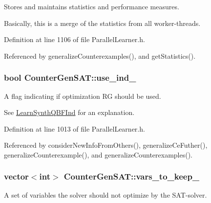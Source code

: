 Stores and maintains statistics and performance measures. 

Basically, this is a merge of the statistics from all worker-\/threads. 

Definition at line 1106 of file Parallel\-Learner.\-h.



Referenced by generalize\-Counterexamples(), and get\-Statistics().

\hypertarget{classCounterGenSAT_a4f76493e0c49329ae7f628af99a450f4}{
\subsubsection[{use\-\_\-ind\-\_\-}]{\setlength{\rightskip}{0pt plus 5cm}bool Counter\-Gen\-S\-A\-T\-::use\-\_\-ind\-\_\-\hspace{0.3cm}{\ttfamily [protected]}}}\label{classCounterGenSAT_a4f76493e0c49329ae7f628af99a450f4}


A flag indicating if optimization R\-G should be used. 

See \hyperlink{classLearnSynthQBFInd}{Learn\-Synth\-Q\-B\-F\-Ind} for an explanation. 

Definition at line 1013 of file Parallel\-Learner.\-h.



Referenced by consider\-New\-Info\-From\-Others(), generalize\-Ce\-Futher(), generalize\-Counterexample(), and generalize\-Counterexamples().

\hypertarget{classCounterGenSAT_a0c568c2e441491d24a5a98623fa6ce6a}{
\subsubsection[{vars\-\_\-to\-\_\-keep\-\_\-}]{\setlength{\rightskip}{0pt plus 5cm}vector$<$int$>$ Counter\-Gen\-S\-A\-T\-::vars\-\_\-to\-\_\-keep\-\_\-\hspace{0.3cm}{\ttfamily [protected]}}}\label{classCounterGenSAT_a0c568c2e441491d24a5a98623fa6ce6a}


A set of variables the solver should not optimize by the S\-A\-T-\/solver. 


